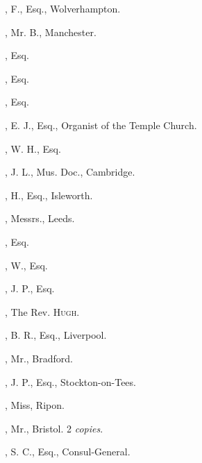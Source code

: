 \begin{multicols}{2}
, F., Esq., Wolverhampton.

, Mr. B., Manchester.

, Esq.

, Esq.

, Esq.

, E. J., Esq., Organist of the
Temple Church.

, W. H., Esq.

, J. L., Mus. Doc., Cambridge.

, H., Esq., Isleworth.

, Messrs., Leeds.

, Esq.

, W., Esq.

, J. P., Esq.

, The Rev. \textsc{Hugh}.
\bigskip

, B. R., Esq., Liverpool.
\bigskip

, Mr., Bradford.

, J. P., Esq., Stockton-on-Tees.
\bigskip

, Miss, Ripon.

, Mr., Bristol. 2 \textit{copies}.

, S. C., Esq., Consul-General.
\end{multicols}
\pagebreak